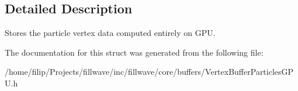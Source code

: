 \subsection{Detailed Description}
Stores the particle vertex data computed entirely on G\+PU. 

The documentation for this struct was generated from the following file\+:\begin{DoxyCompactItemize}
\item 
/home/filip/\+Projects/fillwave/inc/fillwave/core/buffers/Vertex\+Buffer\+Particles\+G\+P\+U.\+h\end{DoxyCompactItemize}
